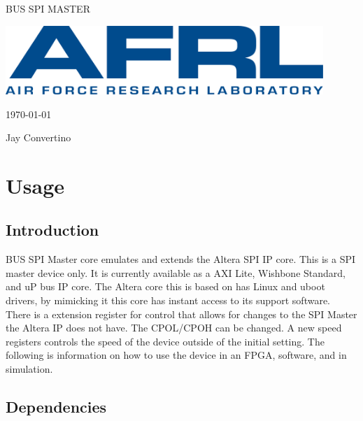\begin{titlepage}
  \begin{center}

  {\Huge BUS SPI MASTER}

  \vspace{25mm}

  \includegraphics[width=0.90\textwidth,height=\textheight,keepaspectratio]{img/AFRL.png}

  \vspace{25mm}

  \today

  \vspace{15mm}

  {\Large Jay Convertino}

  \end{center}
\end{titlepage}

\tableofcontents

\newpage

\section{Usage}

\subsection{Introduction}

\par
BUS SPI Master core emulates and extends the Altera SPI IP core. This is a SPI master device only. It is
currently available as a AXI Lite, Wishbone Standard, and uP bus IP core. The Altera core this is based on has Linux
and uboot drivers, by mimicking it this core has instant access to its support software. There is a extension register for control
that allows for changes to the SPI Master the Altera IP does not have. The CPOL/CPOH can be changed. A new speed registers
controls the speed of the device outside of the initial setting. The following is information on how to use the
device in an FPGA, software, and in simulation.

\subsection{Dependencies}

